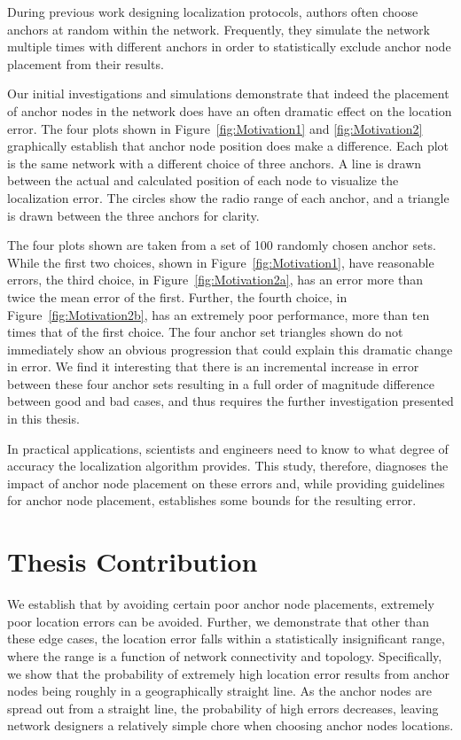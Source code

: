 During previous work designing localization protocols\cite[p. 11]{CCA-MAP09}\cite[p.2 ]{MDS-MAP}, authors often choose anchors at random within the network.  Frequently, they simulate the network multiple times with different anchors in order to statistically exclude anchor node placement from their results. 

Our initial investigations and simulations demonstrate that indeed the placement of anchor nodes in the network does have an often dramatic effect on the location error.  The four plots shown in Figure~\ref{fig:Motivation1} and \ref{fig:Motivation2} graphically establish that anchor node position does make a difference.  Each plot is the same network with a different choice of three anchors.  A line is drawn between the actual and calculated position of each node to visualize the localization error.  The circles show the radio range of each anchor, and a triangle is drawn between the three anchors for clarity.  

The four plots shown are taken from a set of 100 randomly chosen anchor sets.  While the first two choices, shown in Figure~\ref{fig:Motivation1}, have reasonable errors, the third choice, in Figure~\ref{fig:Motivation2a}, has an error more than twice the mean error of the first.  Further, the fourth choice, in Figure~\ref{fig:Motivation2b}, has an extremely poor performance, more than ten times that of the first choice.  The four anchor set triangles shown do not immediately show an obvious progression that could explain this dramatic change in error. We find it interesting that there is an incremental increase in error between these four anchor sets resulting in a full order of magnitude difference between good and bad cases, and thus requires the further investigation presented in this thesis.

In practical applications, scientists and engineers need to know to what degree of accuracy the localization algorithm provides. This study, therefore, diagnoses the impact of anchor node placement on these errors and, while providing guidelines for anchor node placement, establishes some bounds for the resulting error. 

\section{Thesis Contribution}
We establish that by avoiding certain poor anchor node placements, extremely poor location errors can be avoided.  Further, we demonstrate that other than these edge cases, the location error falls within a statistically insignificant range, where the range is a function of network connectivity and topology.  Specifically, we show that the probability of extremely high location error results from anchor nodes being roughly in a geographically straight line.  As the anchor nodes are spread out from a straight line, the probability of high errors decreases, leaving network designers a relatively simple chore when choosing anchor nodes locations.

